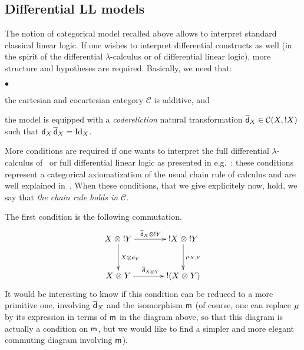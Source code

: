 \documentclass{LMCS}
\newcommand{\lam}{\ensuremath{\lambda}}
\newcommand{\scC}{\mathcal{C}}
\begin{document}
\subsection{Differential LL models}
The notion of categorical model recalled above allows to interpret standard
classical linear logic. If one wishes to interpret differential constructs as
well (in the spirit of the differential \lam-calculus or of differential
linear logic), more structure and hypotheses are required. Basically, we need that:
\begin{iteMize}{$\bullet$}
\item the cartesian and cocartesian category $\scC$ is additive, and
\item the model is equipped with a \emph{codereliction} natural
  transformation $\Coder X\in\scC(X,\Excl X)$ such that $\mathsf d_{X}\,{\overline{\mathsf d}}_{X}=\operatorname{Id}_X$. 
\end{iteMize}
More conditions are required if one wants to interpret the full differential
\lam-calculus of~\cite{EhrhardR03} or full differential linear logic as presented
in e.g.~\cite{Pagani09}: these conditions represent a categorical axiomatization of
the usual chain rule of calculus and are well explained in~\cite{Fiore07}. When these conditions, that we give explicitely now, hold,
we say that \emph{the chain rule holds in $\scC$}.

The first condition is the following commutation.
\begin{equation*}\label{eq:der-coder-monoidal}
\vcenter{\hbox{\xymatrix @R=3em @C=3pc
{
  \Tens{X}{\Excl Y}\ar[r]^{\Tens{\Coder X}{\Excl Y}}\ar[d]^{\Tens{X}{\Der Y}}
  & \Tens{\Excl X}{\Excl Y}\ar[d]^{\Monoidal_{X,Y}}\\
  \Tens XY\ar[r]^{\Coder{\Tens XY}}
  & \Excl{(\Tens XY)}
}}}
\end{equation*}
It would be interesting to know if this condition can be reduced to a more
primitive one, involving ${\overline{\mathsf d}}_{X}$ and the isomorphism $\mathsf m$ (of course,
one can replace $\mu$ by its expression in terms of $\mathsf m$ in the
diagram above, so that this diagram is actually a condition on
$\mathsf m$, but we would like to find a simpler and more elegant commuting
diagram involving $\mathsf m$).
\end{document}
